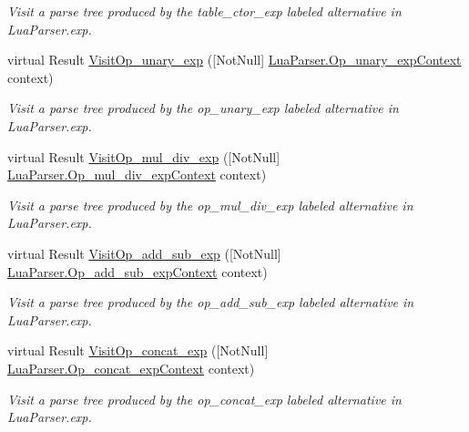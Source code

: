 \begin{DoxyCompactItemize}
\begin{DoxyCompactList}\small\item\em Visit a parse tree produced by the {\ttfamily table\+\_\+ctor\+\_\+exp} labeled alternative in Lua\+Parser.\+exp. \end{DoxyCompactList}\item 
virtual Result \mbox{\hyperlink{classzlua_1_1_lua_base_visitor_a36b016a0f996e60c5aa18d5d06394eb4}{Visit\+Op\+\_\+unary\+\_\+exp}} (\mbox{[}Not\+Null\mbox{]} \mbox{\hyperlink{classzlua_1_1_lua_parser_1_1_op__unary__exp_context}{Lua\+Parser.\+Op\+\_\+unary\+\_\+exp\+Context}} context)
\begin{DoxyCompactList}\small\item\em Visit a parse tree produced by the {\ttfamily op\+\_\+unary\+\_\+exp} labeled alternative in Lua\+Parser.\+exp. \end{DoxyCompactList}\item 
virtual Result \mbox{\hyperlink{classzlua_1_1_lua_base_visitor_aeebcee477db462f0670252868b88fc35}{Visit\+Op\+\_\+mul\+\_\+div\+\_\+exp}} (\mbox{[}Not\+Null\mbox{]} \mbox{\hyperlink{classzlua_1_1_lua_parser_1_1_op__mul__div__exp_context}{Lua\+Parser.\+Op\+\_\+mul\+\_\+div\+\_\+exp\+Context}} context)
\begin{DoxyCompactList}\small\item\em Visit a parse tree produced by the {\ttfamily op\+\_\+mul\+\_\+div\+\_\+exp} labeled alternative in Lua\+Parser.\+exp. \end{DoxyCompactList}\item 
virtual Result \mbox{\hyperlink{classzlua_1_1_lua_base_visitor_aa4492d5f54ee93070caba1efbcdcf7f2}{Visit\+Op\+\_\+add\+\_\+sub\+\_\+exp}} (\mbox{[}Not\+Null\mbox{]} \mbox{\hyperlink{classzlua_1_1_lua_parser_1_1_op__add__sub__exp_context}{Lua\+Parser.\+Op\+\_\+add\+\_\+sub\+\_\+exp\+Context}} context)
\begin{DoxyCompactList}\small\item\em Visit a parse tree produced by the {\ttfamily op\+\_\+add\+\_\+sub\+\_\+exp} labeled alternative in Lua\+Parser.\+exp. \end{DoxyCompactList}\item 
virtual Result \mbox{\hyperlink{classzlua_1_1_lua_base_visitor_a122ef407ec779e8922c617dc3a095356}{Visit\+Op\+\_\+concat\+\_\+exp}} (\mbox{[}Not\+Null\mbox{]} \mbox{\hyperlink{classzlua_1_1_lua_parser_1_1_op__concat__exp_context}{Lua\+Parser.\+Op\+\_\+concat\+\_\+exp\+Context}} context)
\begin{DoxyCompactList}\small\item\em Visit a parse tree produced by the {\ttfamily op\+\_\+concat\+\_\+exp} labeled alternative in Lua\+Parser.\+exp. \end{DoxyCompactList}\item 

\end{DoxyCompactItemize}
